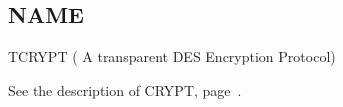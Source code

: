 %
%

\subsection*{NAME}

\noindent TCRYPT ( A transparent DES Encryption Protocol)

See the description of CRYPT, page~\pageref{CRYPT}.



